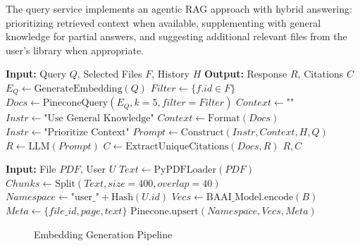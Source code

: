 \documentclass[conference]{IEEEtran}
\begin{document}
The query service implements an agentic RAG approach with hybrid answering: prioritizing retrieved context when available, supplementing with general knowledge for partial answers, and suggesting additional relevant files from the user's library when appropriate.

\begin{algorithm}
\caption{RAG & Semantic Search}
\begin{algorithmic}[1]
\STATE \textbf{Input:} Query $Q$, Selected Files $F$, History $H$
\STATE \textbf{Output:} Response $R$, Citations $C$
\STATE $E_Q \leftarrow \text{GenerateEmbedding}(Q)$
\STATE $Filter \leftarrow \{f.id \in F\}$
\STATE $Docs \leftarrow \text{PineconeQuery}(E_Q, k=5, filter=Filter)$
    \STATE $Context \leftarrow \text{""}$
    \STATE $Instr \leftarrow \text{"Use General Knowledge"}$
\ELSE
    \STATE $Context \leftarrow \text{Format}(Docs)$
    \STATE $Instr \leftarrow \text{"Prioritize Context"}$
\ENDIF
\STATE $Prompt \leftarrow \text{Construct}(Instr, Context, H, Q)$
\STATE $R \leftarrow \text{LLM}(Prompt)$
\STATE $C \leftarrow \text{ExtractUniqueCitations}(Docs, R)$
\RETURN $R, C$
\end{algorithmic}
\end{algorithm}

\begin{algorithm}
\caption{Embedding Generation}
\begin{algorithmic}[1]
\STATE \textbf{Input:} File $PDF$, User $U$
\STATE $Text \leftarrow \text{PyPDFLoader}(PDF)$
\STATE $Chunks \leftarrow \text{Split}(Text, size=400, overlap=40)$
\STATE $Namespace \leftarrow \text{"user\_"} + \text{Hash}(U.id)$
    \STATE $Vecs \leftarrow \text{BAAI\_Model.encode}(B)$
    \STATE $Meta \leftarrow \{file\_id, page, text\}$
    \STATE $\text{Pinecone.upsert}(Namespace, Vecs, Meta)$
\ENDFOR
\end{algorithmic}
\end{algorithm}

\begin{figure}[htbp]
\centering
{}
\caption{Embedding Generation Pipeline}
\label{fig:embed_flow}
\end{figure}
\end{document}
